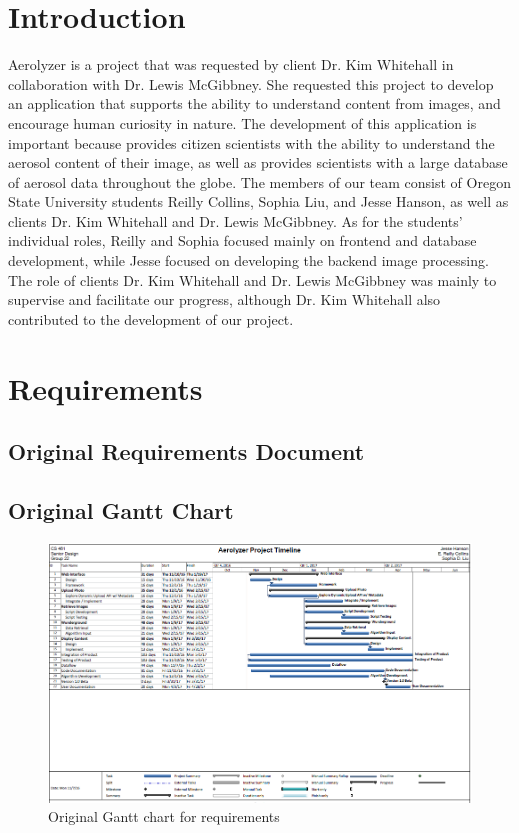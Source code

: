 \documentclass[onecolumn, draftclsnofoot,10pt, compsoc]{IEEEtran}
\begin{document}
\begin{flushleft}
\section{Introduction}
Aerolyzer is a project that was requested by client Dr. Kim Whitehall in collaboration with Dr. Lewis McGibbney. She requested this project to develop an application that supports the ability to understand content from images, and encourage human curiosity in nature. The development of this application is important because provides citizen scientists with the ability to understand the aerosol content of their image, as well as provides scientists with a large database of aerosol data throughout the globe. The members of our team consist of Oregon State University students Reilly Collins, Sophia Liu, and Jesse Hanson, as well as clients Dr. Kim Whitehall and Dr. Lewis McGibbney. As for the students' individual roles, Reilly and Sophia focused mainly on frontend and database development, while Jesse focused on developing the backend image processing. The role of clients Dr. Kim Whitehall and Dr. Lewis McGibbney was mainly to supervise and facilitate our progress, although Dr. Kim Whitehall also contributed to the development of our project.

\section{Requirements}
\subsection{Original Requirements Document}
\clearpage

 
\subsection{Original Gantt Chart}
\begin{figure}[H]
\centering
  \includegraphics[width=\textwidth]{gantt_original.PNG}
  \caption{Original Gantt chart for requirements}
  \label{fig:gantt_original}
\end{figure}
 

\end{flushleft}
\end{document}
